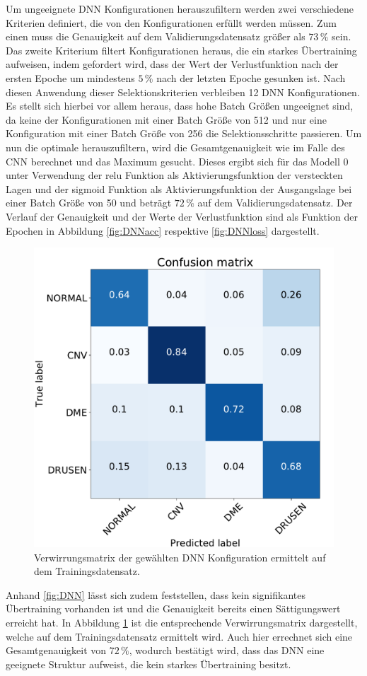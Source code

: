 \setcounter{subfigure}{0}
Um ungeeignete DNN Konfigurationen herauszufiltern werden zwei verschiedene Kriterien definiert, die von den Konfigurationen erfüllt werden müssen. Zum einen muss die Genauigkeit auf dem Validierungsdatensatz größer als $73\,\%$ sein. Das zweite Kriterium filtert Konfigurationen heraus, die ein starkes Übertraining aufweisen, indem gefordert wird, dass der Wert der Verlustfunktion nach der ersten Epoche um mindestens $5\,\%$ nach der letzten Epoche gesunken ist. Nach diesen Anwendung dieser Selektionskriterien verbleiben 12 DNN Konfigurationen. Es stellt sich hierbei vor allem heraus, dass hohe Batch Größen ungeeignet sind, da keine der Konfigurationen mit einer Batch Größe von 512 und nur eine Konfiguration mit einer Batch Größe von 256 die Selektionsschritte passieren. Um nun die optimale herauszufiltern, wird die Gesamtgenauigkeit wie im Falle des CNN berechnet und das Maximum gesucht. Dieses ergibt sich für das Modell 0 unter Verwendung der relu Funktion als Aktivierungsfunktion der versteckten Lagen und der sigmoid Funktion als Aktivierungsfunktion der Ausgangslage bei einer Batch Größe von 50 und beträgt $72\,\%$ auf dem Validierungsdatensatz. Der Verlauf der Genauigkeit und der Werte der Verlustfunktion sind als Funktion der Epochen in Abbildung \ref{fig:DNNacc} respektive \ref{fig:DNNloss} dargestellt. \\
\begin{figure}[!t]
\centering
 \includegraphics[width=.45\linewidth]{fig/confusionmatrix6test.pdf}
 \caption{Verwirrungsmatrix der gewählten DNN Konfiguration ermittelt auf dem Trainingsdatensatz.}
 \label{fig:ConfmatDNN}
\end{figure}
Anhand \ref{fig:DNN} lässt sich zudem feststellen, dass kein signifikantes Übertraining vorhanden ist und die Genauigkeit bereits einen Sättigungswert erreicht hat. In Abbildung \ref{fig:ConfmatDNN} ist die entsprechende Verwirrungsmatrix dargestellt, welche auf dem Trainingsdatensatz ermittelt wird. Auch hier errechnet sich eine Gesamtgenauigkeit von $72\,\%$, wodurch bestätigt wird, dass das DNN eine geeignete Struktur aufweist, die kein starkes Übertraining besitzt. 

